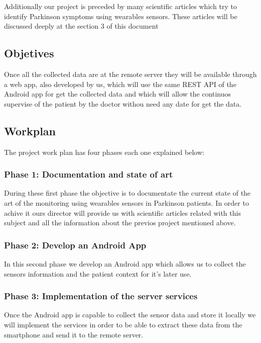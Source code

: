 \documentclass[11pt,spanish]{article}
\begin{document}
Additionally our project is preceded by many scientific articles which try to identify Parkinson symptoms using wearables sensors. These articles will be discussed deeply at the section 3 of this document
\newline

\subsection{Objetives}

Once all the collected data are at the remote server they will be available through a web app, also developed by us, which will use the same REST API of the Android app for get the collected data and which will allow the continuos supervise of the patient by the doctor withou need any date for get the data.
\newpage

\subsection{Workplan}

The project work plan has four phases each one explained below:

\subsubsection{Phase 1: Documentation and state of art}

During these first phase the objective is to documentate the current state of the art of the monitoring using wearables sensors in Parkinson patients. In order to achive it ours director will provide us with scientific articles related with this subject and all the information about the previos project mentioned above.

\subsubsection{Phase 2: Develop an Android App}

In this second phase we develop an Android app which allows us to collect the sensors information and the patient context for it's later use.

\subsubsection{Phase 3: Implementation of the server services}

Once the Android app is capable to collect the sensor data and store it locally we will implement the services in order to be able to extract these data from the smartphone and send it to the remote server.
\end{document}
